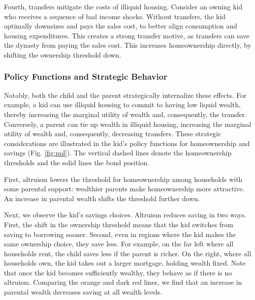 \documentclass[12pt]{article}
\begin{document}
Fourth, transfers mitigate the costs of illiquid housing. Consider an owning kid who receives a sequence of bad income shocks. Without transfers, the kid optimally downsizes and pays the sales cost, to better align consumption and housing expenditures. This creates a strong transfer motive, as transfers can save the dynasty from paying the sales cost. This increases homeownership directly, by shifting the ownership threshold down.

\subsubsection{Policy Functions and Strategic Behavior}\label{sec:policyfuncs}
Notably, both the child and the parent strategically internalize these effects. For example, a kid can use illiquid housing to commit to having low liquid wealth, thereby increasing the marginal utility of wealth and, consequently, the transfer. Conversely, a parent can tie up wealth in illiquid housing, increasing the marginal utility of wealth and, consequently, decreasing transfers. These strategic considerations are illustrated in the kid's policy functions for homeownership and savings (Fig. \ref{fig:pol}). The vertical dashed lines denote the homeownership thresholds and the solid lines the bond position.

First, altruism lowers the threshold for homeownership among households with some parental support: wealthier parents make homeownership more attractive. An increase in parental wealth shifts the threshold further down.

Next, we observe the kid's savings choices. Altruism reduces saving in two ways. First, the shift in the ownership threshold means that the kid switches from saving to borrowing sooner. Second, even in regions where the kid makes the same ownership choice, they save less. For example, on the far left where all households rent, the child saves less if the parent is richer. On the right, where all households own, the kid takes out a larger mortgage, holding wealth fixed. Note that once the kid becomes sufficiently wealthy, they behave as if there is no altruism. Comparing the orange and dark red lines, we find that an increase in parental wealth decreases saving at all wealth levels.
\end{document}
